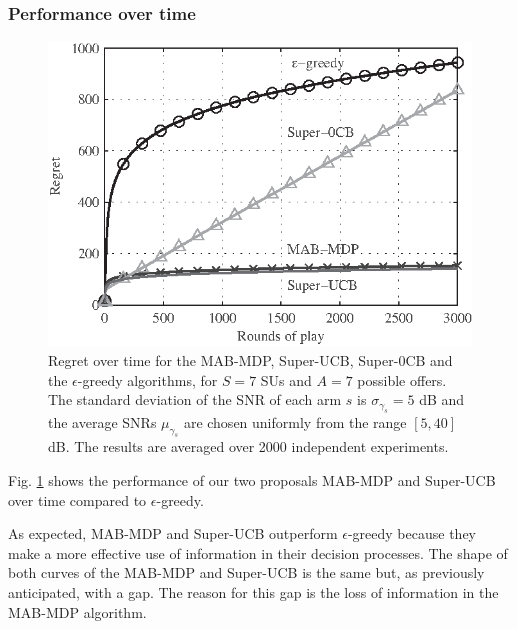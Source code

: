 \subsubsection{Performance over time}
\begin{figure}[!t]
\centering
\includegraphics{stoVsT.eps}
\caption{Regret over time for the MAB-MDP, Super-UCB, Super-0CB and the $\epsilon$-greedy algorithms, for $S=7$ SUs and $A=7$ possible offers. The standard deviation of the SNR of each arm $s$ is $\sigma_{\gamma_s} = 5$ dB and the average SNRs $\mu_{\gamma_s}$ are chosen uniformly from the range $[5,40]$ dB. The results are averaged over 2000 independent experiments.}
\label{fig:stoVsT}
\end{figure}

Fig. \ref{fig:stoVsT} shows the performance of our two proposals MAB-MDP and Super-UCB over time compared to $\epsilon$-greedy. 

As expected, MAB-MDP and Super-UCB outperform $\epsilon$-greedy because they make a more effective use of information in their decision processes. The shape of both curves of the MAB-MDP and Super-UCB is the same but, as previously anticipated, with a gap. The reason for this gap is the loss of information in the MAB-MDP algorithm.

